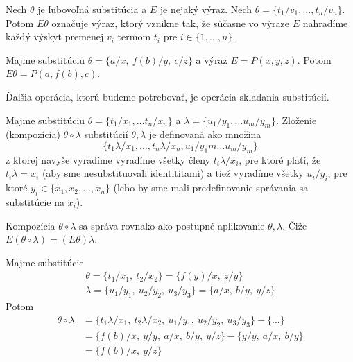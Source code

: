 \begin{definicia}
    Nech $\theta$ je ľubovoľná substitúcia a $E$ je nejaký výraz.
    Nech $\theta = \{ t_1/v_1, \dots, t_n/v_n\}$.
    Potom $E\theta$ označuje výraz, ktorý vznikne tak,
    že súčasne vo výraze $E$ nahradíme každý výskyt premenej $v_i$ termom $t_i$
    pre $i \in \{1,\dots,n\}$.
\end{definicia}

\begin{priklad}
    Majme substitúciu $\theta=\{a/x,\ f(b)/y,\ c/z\}$
    a výraz $E = P(x, y, z)$.
    Potom $E\theta = P(a, f(b), c)$.
\end{priklad}

\medskip
\noindent
Ďalšia operácia, ktorú budeme potrebovať, je operácia skladania
substitúcií.

\begin{definicia}
    Majme substitúciu $\theta = \{t_1/x_1, \ldots t_n/x_n\}$ a
    $\lambda = \{ u_1/y_1, \ldots u_m/y_m \}$.
    Zloženie (kompozícia) $\theta \circ \lambda$ substitúcií
    $\theta,\lambda$ je definovaná ako množina
    \begin{equation*}
        \{t_1 \lambda/x_1, \dots, t_n \lambda/x_n, u_1/y_1m \dots u_m/y_m \}
    \end{equation*}
    z ktorej navyše vyradíme vyradíme všetky členy $t_i\lambda/x_i$,
    pre ktoré platí, že $t_i \lambda = x_i$ (aby sme nesubstituovali
    identititami)
    a tiež vyradíme všetky $u_i/y_i$,
    pre ktoré $y_i \in \{x_1, x_2, \dots, x_n\}$ (lebo by sme mali
    predefinovanie správania sa substitúcie na $x_i$).
\end{definicia}

\begin{poznamka}
    Kompozícia $\theta \circ \lambda$ sa správa rovnako ako postupné
    aplikovanie $\theta, \lambda$. Čiže
    $E(\theta \circ \lambda) = (E\theta)\lambda$.
\end{poznamka}

\begin{priklad}
    Majme substitúcie
    \begin{align*}
        \theta = \{t_1/x_1,\ t_2/x_2\} = \{ f(y)/x,\ z/y\} \\
        \lambda = \{u_1/y_1,\ u_2/y_2,\ u_3/y_3\} = \{ a/x,\ b/y,\ y/z\}
    \end{align*}
    Potom
    \begin{equation*}
    \begin{split}
        \theta \circ \lambda &= 
            \{ t_1 \lambda / x_1,\ t_2\lambda/x_2,\
            u_1/y_1,\ u_2/y_2,\ u_3/y_3\} - \{\dots\} \\ 
        &= \{f(b)/x,\ y/y,\ a/x,\ b/y,\ y/z\} - \{y/y,\ a/x,\ b/y\} \\
        &= \{f(b)/x,\ y/z\}
    \end{split}
    \end{equation*}
\end{priklad}

